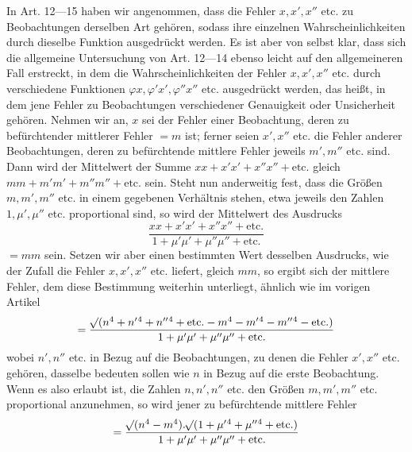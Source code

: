In Art. 12---15 haben wir angenommen, dass die Fehler \(x,x',x''\) etc. zu Beobachtungen derselben Art gehören, sodass ihre einzelnen Wahrscheinlichkeiten durch dieselbe Funktion ausgedrückt werden. Es ist aber von selbst klar, dass sich die allgemeine Untersuchung von Art. 12---14 ebenso leicht auf den allgemeineren Fall erstreckt, in dem die Wahrscheinlichkeiten der Fehler \(x,x',x''\) etc. durch verschiedene Funktionen \(\varphi x,\varphi'x',\varphi''x''\) etc. ausgedrückt werden, das heißt, in dem jene Fehler zu Beobachtungen verschiedener Genauigkeit oder Unsicherheit gehören. Nehmen wir an, \(x\) sei der Fehler einer Beobachtung, deren zu befürchtender mittlerer Fehler \(=m\) ist; ferner seien \(x',x''\) etc. die Fehler anderer Beobachtungen, deren zu befürchtende mittlere Fehler jeweils \(m',m''\) etc. sind. Dann wird der Mittelwert der Summe \(xx+x'x'+x''x''+\text{etc.}\) gleich \(mm+m'm'+m''m''+\text{etc.}\) sein. Steht nun anderweitig fest, dass die Größen \(m,m',m''\) etc. in einem gegebenen Verhältnis stehen, etwa jeweils den Zahlen \(1,\mu',\mu''\) etc. proportional sind, so wird der Mittelwert des Ausdrucks
\[
\frac{xx+x'x'+x''x''+\text{etc.}}{1+\mu'\mu'+\mu''\mu''+\text{etc.}}
\]
\(=mm\) sein. Setzen wir aber einen bestimmten Wert desselben Ausdrucks, wie der Zufall die Fehler \(x,x',x''\) etc. liefert, gleich \(mm\), so ergibt sich der mittlere Fehler, dem diese Bestimmung weiterhin unterliegt, ähnlich wie im vorigen Artikel
\[
=\frac{\mathord{{}^{}\!\surd}(n^4+n'{}^4+n''{}^4+\text{etc.}-m^4-m'{}^4-m''{}^4-\text{etc.})}{1+\mu'\mu'+\mu''\mu''+\text{etc.}}
\]
wobei \(n',n''\) etc. in Bezug auf die Beobachtungen, zu denen die Fehler \(x',x''\) etc. gehören, dasselbe bedeuten sollen wie \(n\) in Bezug auf die erste Beobachtung. Wenn es also erlaubt ist, die Zahlen \(n,n',n''\) etc. den Größen \(m,m',m''\) etc. proportional anzunehmen, so wird jener zu befürchtende mittlere Fehler
\[
=\frac{\mathord{{}^{}\!\surd}(n^4-m^4).\mathord{{}^{}\!\surd}(1+\mu'{}^4+\mu''{}^4+\text{etc.})}{1+\mu'\mu'+\mu''\mu''+\text{etc.}}
\]

